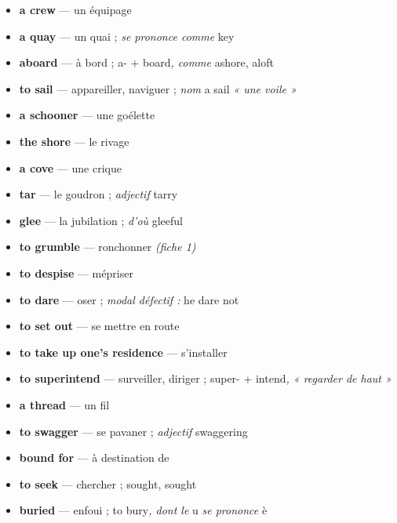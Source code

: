 \documentclass{fiche}
\begin{document}


\begin{itemize}[label=--,itemsep=0.8mm,leftmargin=*]\small
  \item \textbf{a crew} — un équipage
  \item \textbf{a quay} — un quai ; \textit{se prononce comme} key
  \item \textbf{aboard} — à bord ; a- + board\textit{, comme} ashore, aloft
  \item \textbf{to sail} — appareiller, naviguer ; \textit{nom} a sail \textit{« une voile »}
  \item \textbf{a schooner} — une goélette
  \item \textbf{the shore} — le rivage
  \item \textbf{a cove} — une crique
  \item \textbf{tar} — le goudron ; \textit{adjectif} tarry
  \item \textbf{glee} — la jubilation ; \textit{d'où} gleeful
  \item \textbf{to grumble} — ronchonner \textit{(fiche 1)}
  \item \textbf{to despise} — mépriser
  \item \textbf{to dare} — oser ; \textit{modal défectif :} he dare not
  \item \textbf{to set out} — se mettre en route
  \item \textbf{to take up one's residence} — s'installer
  \item \textbf{to superintend} — surveiller, diriger ; super- + intend\textit{, « regarder de haut »}
  \item \textbf{a thread} — un fil
  \item \textbf{to swagger} — se pavaner ; \textit{adjectif} swaggering
  \item \textbf{bound for} — à destination de
  \item \textbf{to seek} — chercher ; sought, sought
  \item \textbf{buried} — enfoui ; to bury\textit{, dont le} u \textit{se prononce} è
\end{itemize}
\end{document}
